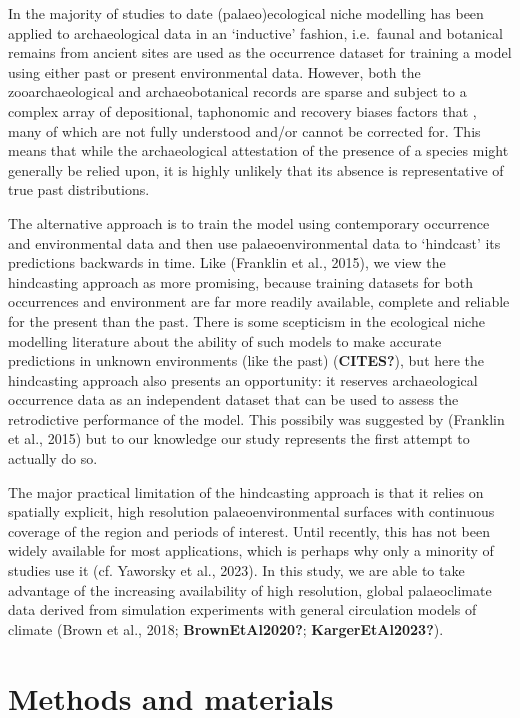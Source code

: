 \documentclass[
  number,
  review]{elsarticle}
\begin{document}
In the majority of studies to date (palaeo)ecological niche modelling
has been applied to archaeological data in an `inductive' fashion,
i.e.~faunal and botanical remains from ancient sites are used as the
occurrence dataset for training a model using either past or present
environmental data. However, both the zooarchaeological and
archaeobotanical records are sparse and subject to a complex array of
depositional, taphonomic and recovery biases factors that , many of
which are not fully understood and/or cannot be corrected for. This
means that while the archaeological attestation of the presence of a
species might generally be relied upon, it is highly unlikely that its
absence is representative of true past distributions.

The alternative approach is to train the model using contemporary
occurrence and environmental data and then use palaeoenvironmental data
to `hindcast' its predictions backwards in time. Like (Franklin et al.,
2015), we view the hindcasting approach as more promising, because
training datasets for both occurrences and environment are far more
readily available, complete and reliable for the present than the past.
There is some scepticism in the ecological niche modelling literature
about the ability of such models to make accurate predictions in unknown
environments (like the past) (\textbf{CITES?}), but here the hindcasting
approach also presents an opportunity: it reserves archaeological
occurrence data as an independent dataset that can be used to assess the
retrodictive performance of the model. This possibily was suggested by
(Franklin et al., 2015) but to our knowledge our study represents the
first attempt to actually do so.

The major practical limitation of the hindcasting approach is that it
relies on spatially explicit, high resolution palaeoenvironmental
surfaces with continuous coverage of the region and periods of interest.
Until recently, this has not been widely available for most
applications, which is perhaps why only a minority of studies use it
(cf. Yaworsky et al., 2023). In this study, we are able to take
advantage of the increasing availability of high resolution, global
palaeoclimate data derived from simulation experiments with general
circulation models of climate (Brown et al., 2018;
\textbf{BrownEtAl2020?}; \textbf{KargerEtAl2023?}).

\section{Methods and materials}\label{methods-and-materials}
\end{document}
